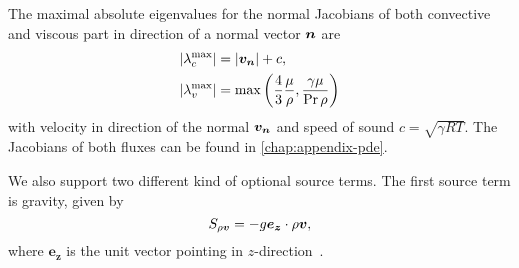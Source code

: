 The maximal absolute eigenvalues for the normal Jacobians of both convective and viscous part in direction of a normal vector $\bm{n}$ are
\begin{align}
  \begin{split}
    \maxConvEigen &=  \vert \Qv_{\normal} \vert + c,\\
    \maxViscEigen &= \max \left( \frac{4}{3} \frac{\mu}{\Qrho},
                        \frac{\gamma \mu}{\Pr \Qrho}\right)
  \end{split}
\end{align}
with velocity in direction of the normal $\bm{v}_{\bm{n}}$ and speed of sound $c = \sqrt{\gamma R T }$.
The Jacobians of both fluxes can be found in \cref{chap:appendix-pde}.

We also support two different kind of optional source terms.
The first source term is gravity, given by
\begin{equation}\label{eq:source-gravity}
  \source[\Qj] = - g \bm{e_z} \cdot \Qj,
\end{equation}
where $\bm{e_z}$ is the unit vector pointing in $z$-direction~\cite{giraldo2008study}.

